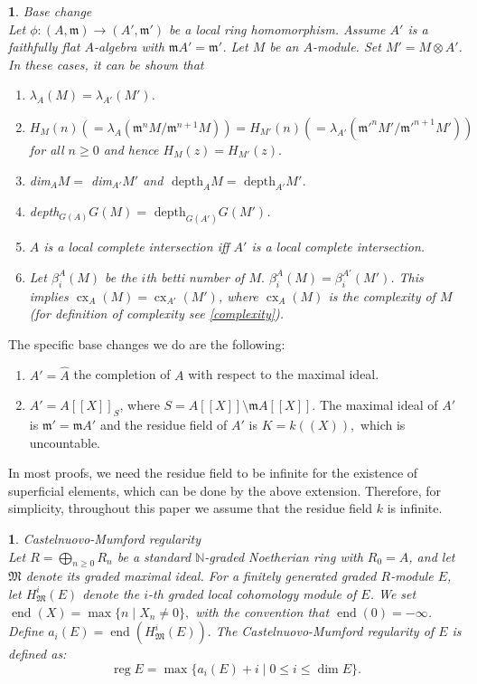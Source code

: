 \documentclass[11pt]{amsart}
\theoremstyle{plain}
\newtheorem{point}[theorem]{}
\newcommand{\m}{\mathfrak{m}}
\theoremstyle{plain}
\begin{document}
\begin{point}\label{basechange}
Base change \\
\normalfont
   Let $\phi:(A,\mathfrak{m})\to (A',\mathfrak{m}')$ be a local ring homomorphism. Assume $A'$ is a faithfully flat $A$-algebra with $\mathfrak{m}A'=\mathfrak{m}'$. Let $M$ be an $A$-module. Set $M'=M\otimes A'$. In these cases, it can be shown that
\begin{enumerate}
    \item $\lambda_A(M)=\lambda_{A'}(M')$.
    \item $H_M(n)(=\lambda_{A}(\m^nM/\m^{n+1}M))=H_{M'}(n)(=\lambda_{A'}({\m'}^nM'/{\m'}^{n+1}M'))$ for all $n\geq 0$ and hence $H_M(z)=H_{M'}(z).$
    \item dim$_{A}M=$ dim$_{A'}M'$ and $\text{ depth}_A M= \text{ depth}_{A'} M'$.
    \item depth$_{G(A)}G(M)=\text{ depth}_{G(A')} G(M')$.
    \item $A$ is a local complete intersection iff $A'$ is a local complete intersection.
    \item Let $\beta^A_i(M)$ be the $i$th betti number of $M.$ $\beta^A_i(M)=\beta^{A'}_i(M')$. This implies $\operatorname{cx}_A(M)=\operatorname{cx}_{A'}(M')$, where $\operatorname{cx}_A(M)$ is the complexity of $M$ (for definition of complexity see \ref{complexity}).
\end{enumerate}
\end{point}
The specific base changes we do are the following:
\begin{enumerate}
    \item[(i)] $A'=\hat{A}$ the completion of $A$ with respect to the maximal ideal.
    \item[(ii)] $A'=A[[X]]_S$, where $S=A[[X]]\setminus \m A[[X]].$ The maximal ideal of $A'$ is $\m '=\m A'$ and the residue field of $A'$ is $K=k((X)),$ which is uncountable.
\end{enumerate}
In most proofs, we need the residue field to be infinite for the existence of superficial elements, which can be done by the above extension. Therefore, for simplicity,  throughout this paper we assume that the residue field $k$ is infinite.

\begin{point} Castelnuovo-Mumford regularity \label{reg1} \\
    \normalfont
Let $R=\bigoplus_{n\geq 0}R_n$ be a standard $\mathbb{N}$-graded Noetherian ring with $R_0=A$, and let $\mathfrak{M}$ denote its graded maximal ideal. For a finitely generated graded $R$-module $E$, let $H^i_{\mathfrak{M}}(E)$ denote the $i$-th graded local cohomology module of $E$. We set $\operatorname{end}(X)=\max\{n\mid X_n\neq0\},$
with the convention that $\operatorname{end}(0)=-\infty$. Define
$a_i(E)=\operatorname{end}
\left(H^i_{\mathfrak{M}}(E)\right).$
The Castelnuovo-Mumford regularity of $E$ is defined as:
\[
\operatorname{reg} E
=
\max\{a_i(E)+i\mid 0\leq i\leq\dim E\}.
\]
\end{point}
\end{document}
